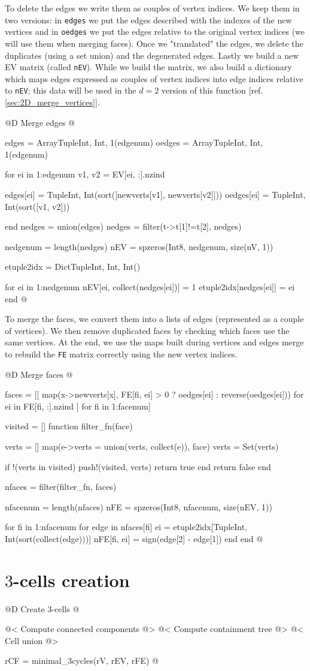To delete the edges we write them as couples of vertex
indices. We keep them in two versions: in \texttt{edges}
we put the edges described with the indexes of the new vertices
and in \texttt{oedges} we put the edges relative to the original vertex
indices (we will use them when merging faces). Once we "translated"
the edges, we delete the duplicates (using a set union) and the
degenerated edges. Lastly we build a new EV matrix 
(called \texttt{nEV}). While we
build the matrix, we also build a dictionary which maps edges expressed
as couples of vertex indices into edge indices relative to \texttt{nEV};
this data will be used in the $d=2$ version of this function 
[ref. \ref{sec:2D_merge_vertices}].

@D Merge edges
@{edges = Array{Tuple{Int, Int}, 1}(edgenum)
oedges = Array{Tuple{Int, Int}, 1}(edgenum)

for ei in 1:edgenum
    v1, v2 = EV[ei, :].nzind
    
    edges[ei] = Tuple{Int, Int}(sort([newverts[v1], newverts[v2]]))
    oedges[ei] = Tuple{Int, Int}(sort([v1, v2]))

end
nedges = union(edges)
nedges = filter(t->t[1]!=t[2], nedges)

nedgenum = length(nedges)
nEV = spzeros(Int8, nedgenum, size(nV, 1))

etuple2idx = Dict{Tuple{Int, Int}, Int}()

for ei in 1:nedgenum
    nEV[ei, collect(nedges[ei])] = 1
    etuple2idx[nedges[ei]] = ei
end
@}

To merge the faces, we convert them into a lists of
edges (represented as a couple of vertices). We then remove duplicated faces
by checking which faces use the same vertices. At the end, we use the
maps built during vertices and edges merge to rebuild the \texttt{FE}
matrix correctly using the new vertex indices.

@D Merge faces
@{faces = [[
    map(x->newverts[x], FE[fi, ei] > 0 ? oedges[ei] : reverse(oedges[ei]))
    for ei in FE[fi, :].nzind
] for fi in 1:facenum]


visited = []
function filter_fn(face)

    verts = []
    map(e->verts = union(verts, collect(e)), face)
    verts = Set(verts)

    if !(verts in visited)
        push!(visited, verts)
        return true
    end
    return false
end

nfaces = filter(filter_fn, faces)

nfacenum = length(nfaces)
nFE = spzeros(Int8, nfacenum, size(nEV, 1))

for fi in 1:nfacenum
    for edge in nfaces[fi]
        ei = etuple2idx[Tuple{Int, Int}(sort(collect(edge)))]
        nFE[fi, ei] = sign(edge[2] - edge[1])
    end
end
@}




\section{$3$-cells creation}

@D Create 3-cells
@{@< Compute connected components @>
@< Compute containment tree @>
@< Cell union @>

rCF = minimal_3cycles(rV, rEV, rFE)
@}